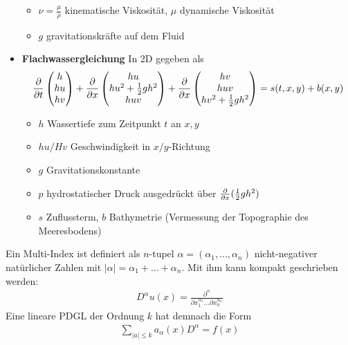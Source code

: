 \begin{definition}
\begin{itemize}[noitemsep]
\begin{itemize}[noitemsep]
			\item  $\nu = \frac{\mu}{\rho}$ kinematische Viskosität, $\mu$ dynamische Viskosität 			
			\item  $g$ gravitationskräfte auf dem Fluid 
		\end{itemize}
		\item \textbf{Flachwassergleichung} In 2D gegeben als
		\begin{align*}
			\frac{\partial }{\partial t}\begin{pmatrix}
				h \\
				h u \\
				h v 
			\end{pmatrix} +
			\frac{\partial }{\partial x} \begin{pmatrix}
				h u \\
				h u^2 + \frac{1}{2} gh^2 \\
				huv
			\end{pmatrix} +
			\frac{\partial }{\partial x} \begin{pmatrix}
				hv \\
				huv \\
				h v^2 + \frac{1}{2} gh^2
			\end{pmatrix} = s(t,x,y) + b(x,y)
		\end{align*} 
	\begin{itemize}[noitemsep]
		\item $h$ Wassertiefe zum Zeitpunkt $t$ an $x,y$
		\item  $h u / H v$ Geschwindigkeit in $x / y$-Richtung
		\item  $g$ Gravitationskonstante
		\item  $p$ hydrostatischer Druck ausgedrückt über $\frac{\partial }{\partial x}(\frac{1}{2}gh^2)$
		\item  $s$ Zuflussterm, $b$ Bathymetrie (Vermessung der Topographie des Meeresbodens)
	\end{itemize}
	\end{itemize}
\end{definition}

\begin{definition}
	Ein Multi-Index ist definiert als $n$-tupel $\alpha = (\alpha_1,...,\alpha_n)$ nicht-negativer natürlicher Zahlen mit $|\alpha| = \alpha_1 + ... + \alpha_n$. Mit ihm kann kompakt geschrieben werden:
	\begin{align*}
		D^\alpha u (x) = \frac{\partial^\alpha}{\partial x_1^{\alpha_1} ... \partial x_n^{\alpha_n}}
	\end{align*}
	Eine lineare PDGL der Ordnung $k$ hat demnach die Form
	\begin{align*}
		\sum_{|a| \leq k} a_\alpha (x) D^\alpha = f(x)
	\end{align*}
\end{definition}

